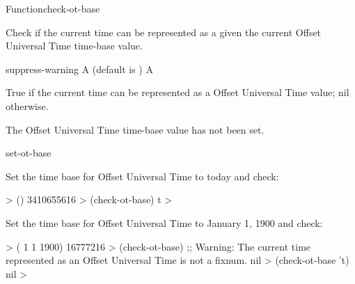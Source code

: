\documentclass[10pt,twoside,english,pdftex]{article}
\begin{document}

\begin{functiondoc}{Function}{check-ot-base}{
    \returns{} }

%

\fnsyntax

\fnpurpose Check if the current time can be represented as a
 given the current Offset Universal Time time-base
value.

\fnpackage {}

\fnmodule {}

\fnargs
\begin{args}{suppress-warning}
 A  (default is \nil)
\arg[boolean] A 
\end{args}

\fnreturns True if the current time can be represented as a
 Offset Universal Time value; nil otherwise.

\fnerrors The Offset Universal Time time-base value has not been set.

\begin{alsos}{set-ot-base}
\also[*ot-base*]
\also[ot2ut]
\also[ut2ot]
\end{alsos}

\fnexamples
Set the time base for Offset Universal Time to today and check:
%
\W\supp
\begin{example}
  > ()
  3410655616
  > (check-ot-base)
  t
  >
\end{example}
%
Set the time base for Offset Universal Time to January 1, 1900 and check:
%
\W\supp\notpretop
\begin{example}
  > ( 1 1 1900)
  16777216
  > (check-ot-base)
  ;; Warning: The current time represented as an Offset Universal Time is not a fixnum.
  nil
  > (check-ot-base 't)
  nil
  >
\end{example}

\end{functiondoc}

\end{document}
